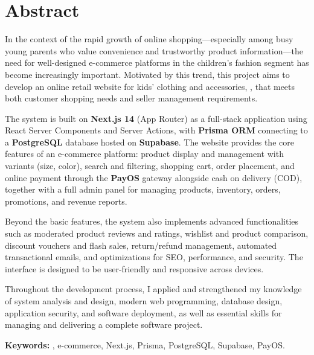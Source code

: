 \chapter*{Abstract}

In the context of the rapid growth of online shopping---especially among busy young parents
who value convenience and trustworthy product information---the need for well-designed
e-commerce platforms in the children's fashion segment has become increasingly important.
Motivated by this trend, this project aims to develop an online retail website for kids'
clothing and accessories, \brandName{}, that meets both customer shopping needs and seller
management requirements.

The system is built on \textbf{Next.js 14} (App Router) as a full-stack application using React
Server Components and Server Actions, with \textbf{Prisma ORM} connecting to a
\textbf{PostgreSQL} database hosted on \textbf{Supabase}. The website provides the core features
of an e-commerce platform: product display and management with variants (size, color), search
and filtering, shopping cart, order placement, and online payment through the \textbf{PayOS}
gateway alongside cash on delivery (COD), together with a full admin panel for managing
products, inventory, orders, promotions, and revenue reports.

Beyond the basic features, the system also implements advanced functionalities such as moderated
product reviews and ratings, wishlist and product comparison, discount vouchers and flash sales,
return/refund management, automated transactional emails, and optimizations for SEO, performance,
and security. The interface is designed to be user-friendly and responsive across devices.

Throughout the development process, I applied and strengthened my knowledge of system analysis
and design, modern web programming, database design, application security, and software
deployment, as well as essential skills for managing and delivering a complete software project.

\vspace{8pt}
\noindent\textbf{Keywords:} \brandName, e-commerce, Next.js, Prisma, PostgreSQL, Supabase, PayOS.
